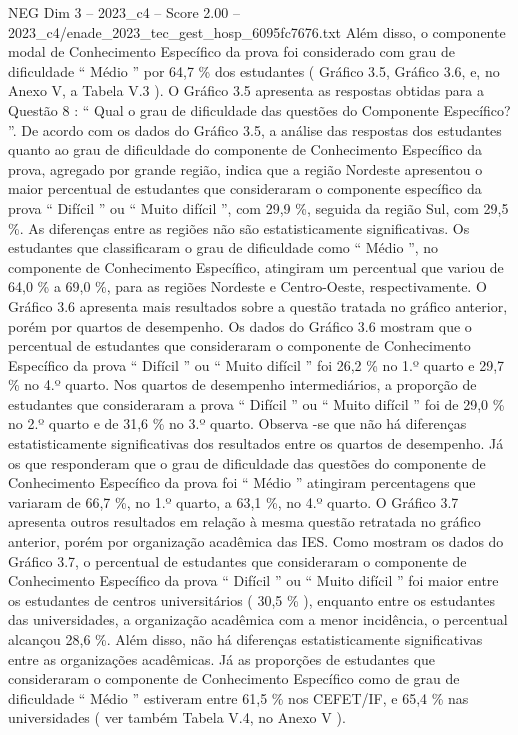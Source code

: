 \begin{textsample}{NEG Dim 3 – 2023\_c4 – Score 2.00 – 2023\_c4/enade\_2023\_tec\_gest\_hosp\_6095fc7676.txt}
Além disso, o componente modal de Conhecimento Específico da prova foi considerado com grau de dificuldade “ Médio ” por 64,7 \% dos estudantes ( Gráfico 3.5, Gráfico 3.6, e, no Anexo V, a Tabela V.3 ).
O Gráfico 3.5 apresenta as respostas obtidas para a Questão 8 : “ Qual o grau de dificuldade das questões do Componente Específico? ”.
De acordo com os dados do Gráfico 3.5, a análise das respostas dos estudantes quanto ao grau de dificuldade do componente de Conhecimento Específico da prova, agregado por grande região, indica que a região Nordeste apresentou o maior percentual de estudantes que consideraram o componente específico da prova “ Difícil ” ou “ Muito difícil ”, com 29,9 \%, seguida da região Sul, com 29,5 \%.
As diferenças entre as regiões não são estatisticamente significativas.
Os estudantes que classificaram o grau de dificuldade como “ Médio ”, no componente de Conhecimento Específico, atingiram um percentual que variou de 64,0 \% a 69,0 \%, para as regiões Nordeste e Centro-Oeste, respectivamente.
O Gráfico 3.6 apresenta mais resultados sobre a questão tratada no gráfico anterior, porém por quartos de desempenho.
Os dados do Gráfico 3.6 mostram que o percentual de estudantes que consideraram o componente de Conhecimento Específico da prova “ Difícil ” ou “ Muito difícil ” foi 26,2 \% no 1.º quarto e 29,7 \% no 4.º quarto.
Nos quartos de desempenho intermediários, a proporção de estudantes que consideraram a prova “ Difícil ” ou “ Muito difícil ” foi de 29,0 \% no 2.º quarto e de 31,6 \% no 3.º quarto.
Observa -se que não há diferenças estatisticamente significativas dos resultados entre os quartos de desempenho.
Já os que responderam que o grau de dificuldade das questões do componente de Conhecimento Específico da prova foi “ Médio ” atingiram percentagens que variaram de 66,7 \%, no 1.º quarto, a 63,1 \%, no 4.º quarto.
O Gráfico 3.7 apresenta outros resultados em relação à mesma questão retratada no gráfico anterior, porém por organização acadêmica das IES.
Como mostram os dados do Gráfico 3.7, o percentual de estudantes que consideraram o componente de Conhecimento Específico da prova “ Difícil ” ou “ Muito difícil ” foi maior entre os estudantes de centros universitários ( 30,5 \% ), enquanto entre os estudantes das universidades, a organização acadêmica com a menor incidência, o percentual alcançou 28,6 \%.
Além disso, não há diferenças estatisticamente significativas entre as organizações acadêmicas.
Já as proporções de estudantes que consideraram o componente de Conhecimento Específico como de grau de dificuldade “ Médio ” estiveram entre 61,5 \% nos CEFET/IF, e 65,4 \% nas universidades ( ver também Tabela V.4, no Anexo V ).

\end{textsample}
